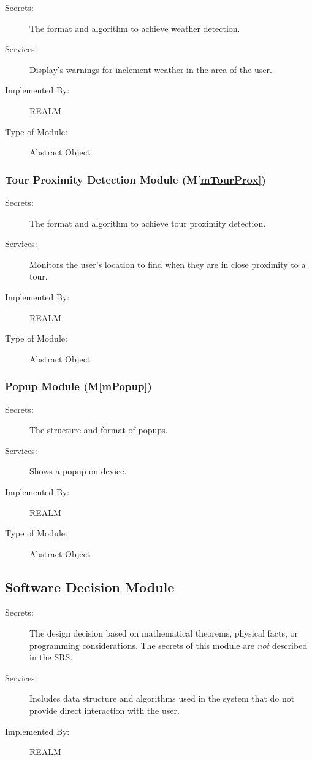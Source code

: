 \documentclass[12pt, titlepage]{article}
\newcommand{\mref}[1]{M\ref{#1}}
\begin{document}
\begin{description}
\item[Secrets:]The format and algorithm to achieve weather detection.
\item[Services:]Display's warnings for inclement weather in the area of the user.
\item[Implemented By:]REALM
\item[Type of Module:]Abstract Object
\end{description}

\subsubsection{Tour Proximity Detection Module (\mref{mTourProx})}

\begin{description}
\item[Secrets:]The format and algorithm to achieve tour proximity detection.
\item[Services:]Monitors the user's location to find when they are in close proximity to a tour.
\item[Implemented By:]REALM
\item[Type of Module:]Abstract Object
\end{description}

\subsubsection{Popup Module (\mref{mPopup})}

\begin{description}
\item[Secrets:]The structure and format of popups.
\item[Services:]Shows a popup on device.
\item[Implemented By:]REALM
\item[Type of Module:]Abstract Object
\end{description}

\subsection{Software Decision Module}

\begin{description}
\item[Secrets:] The design decision based on mathematical theorems, physical
  facts, or programming considerations. The secrets of this module are
  \emph{not} described in the SRS.
\item[Services:] Includes data structure and algorithms used in the system that
  do not provide direct interaction with the user. 
\item[Implemented By:] REALM
\end{description}
\end{document}
